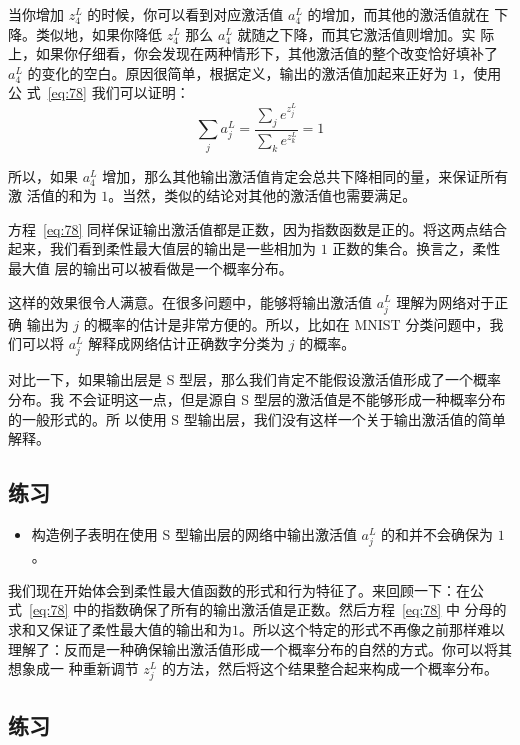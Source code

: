 当你增加 $z^L_4$ 的时候，你可以看到对应激活值 $a^L_4$ 的增加，而其他的激活值就在
下降。类似地，如果你降低 $z^L_4$ 那么 $a^L_4$ 就随之下降，而其它激活值则增加。实
际上，如果你仔细看，你会发现在两种情形下，其他激活值的整个改变恰好填补了 $a^L_4$
的变化的空白。原因很简单，根据定义，输出的激活值加起来正好为 $1$，使用公
式~\eqref{eq:78} 我们可以证明：
\begin{equation}
  \sum_j a^L_j = \frac{\sum_j e^{z^L_j}}{\sum_k e^{z^L_k}} = 1
  \label{eq:79}\tag{79}
\end{equation}

所以，如果 $a^L_4$ 增加，那么其他输出激活值肯定会总共下降相同的量，来保证所有激
活值的和为 $1$。当然，类似的结论对其他的激活值也需要满足。

方程~\eqref{eq:78} 同样保证输出激活值都是正数，因为指数函数是正的。将这两点结合
起来，我们看到柔性最大值层的输出是一些相加为 $1$ 正数的集合。换言之，柔性最大值
层的输出可以被看做是一个概率分布。

这样的效果很令人满意。在很多问题中，能够将输出激活值 $a^L_j$ 理解为网络对于正确
输出为 $j$ 的概率的估计是非常方便的。所以，比如在 MNIST 分类问题中，我们可以将
$a^L_j$ 解释成网络估计正确数字分类为 $j$ 的概率。

对比一下，如果输出层是 S 型层，那么我们肯定不能假设激活值形成了一个概率分布。我
不会证明这一点，但是源自 S 型层的激活值是不能够形成一种概率分布的一般形式的。所
以使用 S 型输出层，我们没有这样一个关于输出激活值的简单解释。

\subsection*{练习}

\begin{itemize}
\item 构造例子表明在使用 S 型输出层的网络中输出激活值 $a^L_j$ 的和并不会确保为
  $1$。
\end{itemize}

我们现在开始体会到柔性最大值函数的形式和行为特征了。来回顾一下：在公
式~\eqref{eq:78} 中的指数确保了所有的输出激活值是正数。然后方程~\eqref{eq:78} 中
分母的求和又保证了柔性最大值的输出和为$1$。所以这个特定的形式不再像之前那样难以
理解了：反而是一种确保输出激活值形成一个概率分布的自然的方式。你可以将其想象成一
种重新调节 $z^L_j$ 的方法，然后将这个结果整合起来构成一个概率分布。

\subsection*{练习}

